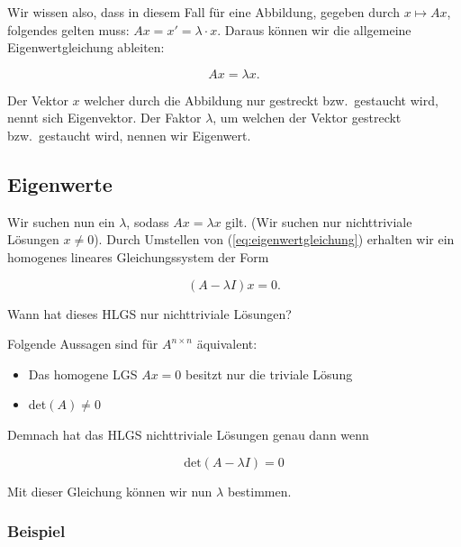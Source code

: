 Wir wissen also, dass in diesem Fall für eine Abbildung, gegeben durch \( x \mapsto Ax \), folgendes gelten muss: \( Ax = x' = \lambda \cdot x \). Daraus können wir die allgemeine Eigenwertgleichung ableiten:

\begin{equation}
    Ax = \lambda x.
    \label{eq:eigenwertgleichung}
\end{equation}

Der Vektor \(x \) welcher durch die Abbildung nur gestreckt bzw.\ gestaucht wird, nennt sich Eigenvektor. Der Faktor \( \lambda \), um welchen der Vektor gestreckt bzw.\ gestaucht wird, nennen wir Eigenwert.

\subsection{Eigenwerte}

Wir suchen nun ein \( \lambda \), sodass \( Ax = \lambda x \) gilt. (Wir suchen nur nichttriviale Lösungen \(x \neq 0\)). Durch Umstellen von (\ref{eq:eigenwertgleichung})  erhalten wir ein homogenes lineares Gleichungssystem der Form

\begin{equation}
    (A - \lambda I) x = 0.
    \label{eq:eigenwertgleichung_homogen}
\end{equation}

Wann hat dieses HLGS nur nichttriviale Lösungen? 

\begin{tcolorbox}[colback=white, colframe=blue!50, title=Erinnerung aus der Linearen Algebra I]
    Folgende Aussagen sind für \( A^{n \times n} \) äquivalent:
    \begin{itemize}
        \item Das homogene LGS \( Ax = 0 \) besitzt nur die triviale Lösung 
        \item det\( (A) \neq 0 \)
    \end{itemize}
\end{tcolorbox}

Demnach hat das HLGS nichttriviale Lösungen genau dann wenn 

\begin{equation*}
    \text{det}(A - \lambda I) = 0
\end{equation*}

Mit dieser Gleichung können wir nun \( \lambda \) bestimmen.

\subsubsection*{Beispiel}

